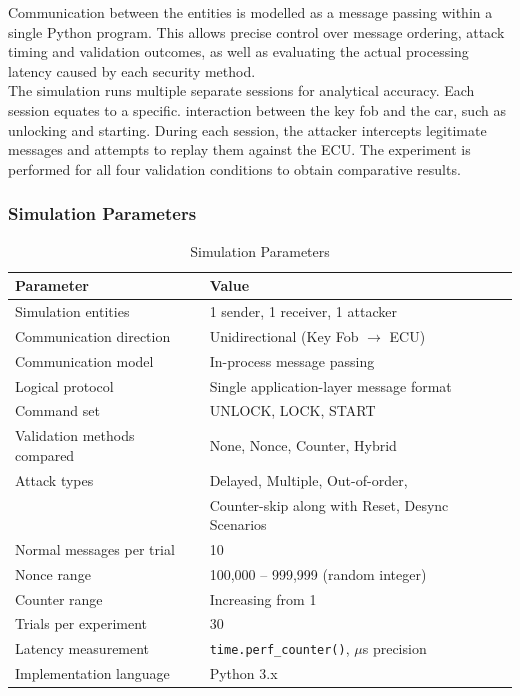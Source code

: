 \documentclass[a4paper,man,12pt]{article}
\begin{document}
Communication between the entities is modelled as a message passing within a single Python program. This allows precise control over message ordering, attack timing and validation outcomes, as well as evaluating the actual processing latency caused by each security method.\\ 

The simulation runs multiple separate sessions for analytical accuracy. Each session equates to a specific. interaction between the key fob and the car, such as unlocking and starting. During each session, the attacker intercepts legitimate messages and attempts to replay them against the ECU. The experiment is performed for all four validation conditions to obtain comparative results.\\ 

\subsubsection{Simulation Parameters}


\begin{table}[h]
\centering
\begin{tabular}{|l|l|}
\hline
\textbf{Parameter} & \textbf{Value} \\
\hline
Simulation entities & 1 sender, 1 receiver, 1 attacker \\
\hline
Communication direction & Unidirectional (Key Fob $\rightarrow$ ECU) \\
\hline
Communication model & In-process message passing \\
\hline
Logical protocol & Single application-layer message format \\
\hline
Command set & UNLOCK, LOCK, START \\
\hline
Validation methods compared & None, Nonce, Counter, Hybrid \\
\hline
Attack types & Delayed, Multiple, Out-of-order, \\
 & Counter-skip along with Reset, Desync Scenarios \\
\hline
Normal messages per trial & 10 \\
\hline
Nonce range & 100{,}000 -- 999{,}999 (random integer) \\
\hline
Counter range & Increasing from 1 \\
\hline
Trials per experiment & 30 \\
\hline
Latency measurement & \texttt{time.perf\_counter()}, $\mu$s precision \\
\hline
Implementation language & Python 3.x \\
\hline
\end{tabular}
\caption{Simulation Parameters}
\label{tab:simparams}
\end{table}
\end{document}
